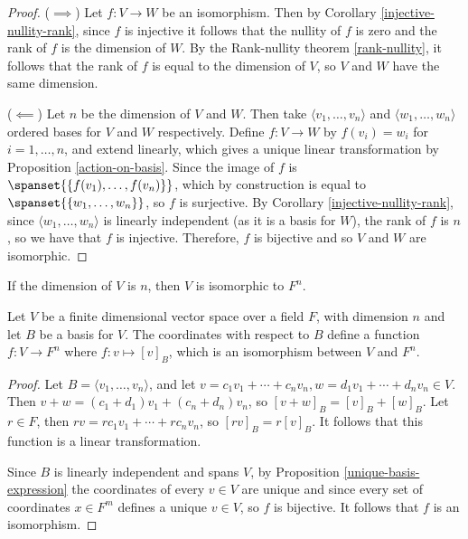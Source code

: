 \documentclass[12pt]{article}
\begin{document}
\begin{proof}\proofbreak
    ($\implies$) Let $f: V \to W$ be an isomorphism. Then by Corollary \ref{injective-nullity-rank}, since $f$ is injective it follows that the nullity of $f$ is zero and the rank of $f$ is the dimension of $W$. By the Rank-nullity theorem \ref{rank-nullity}, it follows that the rank of $f$ is equal to the dimension of $V$, so $V$ and $W$ have the same dimension.

    ($\impliedby$) Let $n$ be the dimension of $V$ and $W$. Then take $\langle v_1, \ldots, v_n \rangle$ and $\langle w_1, \ldots, w_n \rangle$ ordered bases for $V$ and $W$ respectively. Define $f: V \to W$ by $f(v_i) = w_i$ for $i = 1, \ldots, n$, and extend linearly, which gives a unique linear transformation by Proposition \ref{action-on-basis}. Since the image of $f$ is $\spanset{\{f(v_1), \ldots, f(v_n)\}}$, which by construction is equal to $\spanset{\{w_1, \ldots, w_n\}}$, so $f$ is surjective. By Corollary \ref{injective-nullity-rank}, since $\langle w_1, \ldots, w_n \rangle$ is linearly independent (as it is a basis for $W$), the rank of $f$ is $n$, so we have that $f$ is injective. Therefore, $f$ is bijective and so $V$ and $W$ are isomorphic.
\end{proof}

\begin{cor}
    If the dimension of $V$ is $n$, then $V$ is isomorphic to $F^n$.
\end{cor}

\begin{prop}\label{coordinates-are-isomorphism}
    Let $V$ be a finite dimensional vector space over a field $F$, with dimension $n$ and let $B$ be a basis for $V$. The coordinates with respect to $B$ define a function $f: V \to F^n$ where $f: v \mapsto [v]_B$, which is an isomorphism between $V$ and $F^n$.
\end{prop}

\begin{proof}
    Let $B = \langle v_1, \ldots, v_n\rangle$, and let $v = c_1v_1 + \cdots + c_nv_n, w = d_1v_1 + \cdots + d_nv_n \in V$. Then $v + w = (c_1 + d_1)v_1 + (c_n + d_n)v_n$, so $[v+w]_B = [v]_B + [w]_B$. Let $r \in F$, then $rv = rc_1v_1 + \cdots + rc_nv_n$, so $[rv]_B = r[v]_B$. It follows that this function is a linear transformation.

    Since $B$ is linearly independent and spans $V$, by Proposition \ref{unique-basis-expression} the coordinates of every $v \in V$ are unique and since every set of coordinates $x \in F^m$ defines a unique $v \in V$, so $f$ is bijective. It follows that $f$ is an isomorphism.
\end{proof}
\end{document}
